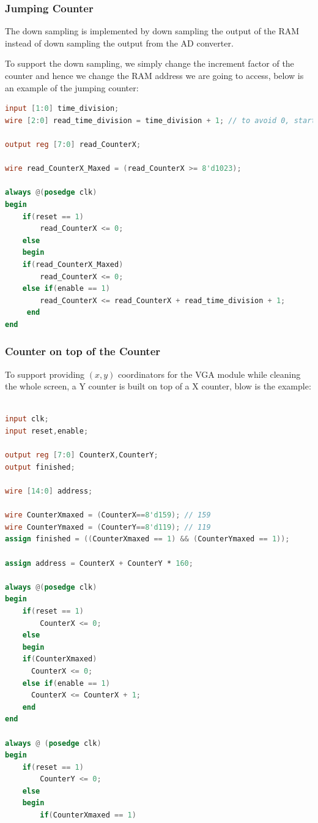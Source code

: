 \documentclass[11pt]{scrartcl}
\begin{document}
\subsubsection{Jumping Counter}
\label{sec:jumcount}

The down sampling is implemented by down sampling the output of the RAM instead of down sampling the output from the AD converter.

To support the down sampling, we simply change the increment factor of the counter and hence we change the RAM address we are going to access, below is an example of the jumping counter:
 
\begin{lstlisting}[language=Verilog]
input [1:0] time_division;
wire [2:0] read_time_division = time_division + 1; // to avoid 0, start from 1

output reg [7:0] read_CounterX;

wire read_CounterX_Maxed = (read_CounterX >= 8'd1023);

always @(posedge clk)
begin
	if(reset == 1)
		read_CounterX <= 0;
	else
	begin
	if(read_CounterX_Maxed)
	  	read_CounterX <= 0;
	else if(enable == 1)
	  	read_CounterX <= read_CounterX + read_time_division + 1;
	 end
end
\end{lstlisting}
\subsubsection{Counter on top of the Counter}
\label{sec:coucount}

To support providing $(x,y)$ coordinators for the VGA module while cleaning the whole screen, a Y counter is built on top of a X counter, blow is the example:
\begin{lstlisting}[language=Verilog]

input clk;
input reset,enable;

output reg [7:0] CounterX,CounterY;
output finished;

wire [14:0] address;

wire CounterXmaxed = (CounterX==8'd159); // 159
wire CounterYmaxed = (CounterY==8'd119); // 119
assign finished = ((CounterXmaxed == 1) && (CounterYmaxed == 1));

assign address = CounterX + CounterY * 160;

always @(posedge clk)
begin
	if(reset == 1)
		CounterX <= 0;
	else
	begin
	if(CounterXmaxed)
	  CounterX <= 0;
	else if(enable == 1)
	  CounterX <= CounterX + 1;
	end
end

always @ (posedge clk)
begin
	if(reset == 1)
		CounterY <= 0;
	else
	begin
		if(CounterXmaxed == 1)
\end{lstlisting}
\end{document}
